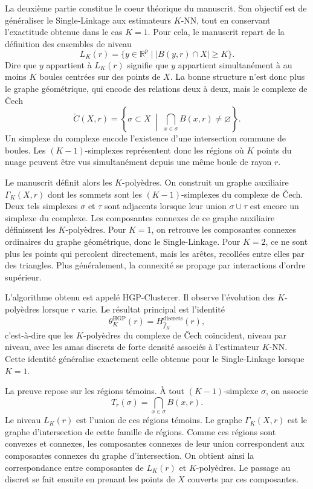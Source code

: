 La deuxième partie constitue le coeur théorique du manuscrit. Son objectif est de généraliser le Single-Linkage aux estimateurs $K$-NN, tout en conservant l'exactitude obtenue dans le cas $K=1$. Pour cela, le manuscrit repart de la définition des ensembles de niveau
\[
L_K(r)=\{y\in \mathbb{R}^p\mid |B(y,r)\cap X|\geq K\}.
\]
Dire que $y$ appartient à $L_K(r)$ signifie que $y$ appartient simultanément à au moins $K$ boules centrées sur des points de $X$. La bonne structure n'est donc plus le graphe géométrique, qui encode des relations deux à deux, mais le complexe de \v{C}ech
\[
\check C(X,r)=\left\{\sigma\subset X\;\middle|\;\bigcap_{x\in\sigma}B(x,r)\neq\varnothing\right\}.
\]
Un simplexe du complexe encode l'existence d'une intersection commune de boules. Les $(K-1)$-simplexes représentent donc les régions où $K$ points du nuage peuvent être vus simultanément depuis une même boule de rayon $r$.

Le manuscrit définit alors les $K$-polyèdres. On construit un graphe auxiliaire $\Gamma_K(X,r)$ dont les sommets sont les $(K-1)$-simplexes du complexe de \v{C}ech. Deux tels simplexes $\sigma$ et $\tau$ sont adjacents lorsque leur union $\sigma\cup\tau$ est encore un simplexe du complexe. Les composantes connexes de ce graphe auxiliaire définissent les $K$-polyèdres. Pour $K=1$, on retrouve les composantes connexes ordinaires du graphe géométrique, donc le Single-Linkage. Pour $K=2$, ce ne sont plus les points qui percolent directement, mais les arêtes, recollées entre elles par des triangles. Plus généralement, la connexité se propage par interactions d'ordre supérieur.

L'algorithme obtenu est appelé HGP-Clusterer. Il observe l'évolution des $K$-polyèdres lorsque $r$ varie. Le résultat principal est l'identité
\[
\theta^{\mathrm{HGP}}_K(r)=H^{\mathrm{discrets}}_{\widehat f_K}(r),
\]
c'est-à-dire que les $K$-polyèdres du complexe de \v{C}ech coïncident, niveau par niveau, avec les amas discrets de forte densité associés à l'estimateur $K$-NN. Cette identité généralise exactement celle obtenue pour le Single-Linkage lorsque $K=1$.

La preuve repose sur les régions témoins. À tout $(K-1)$-simplexe $\sigma$, on associe
\[
T_r(\sigma)=\bigcap_{x\in\sigma}B(x,r).
\]
Le niveau $L_K(r)$ est l'union de ces régions témoins. Le graphe $\Gamma_K(X,r)$ est le graphe d'intersection de cette famille de régions. Comme ces régions sont convexes et connexes, les composantes connexes de leur union correspondent aux composantes connexes du graphe d'intersection. On obtient ainsi la correspondance entre composantes de $L_K(r)$ et $K$-polyèdres. Le passage au discret se fait ensuite en prenant les points de $X$ couverts par ces composantes.

